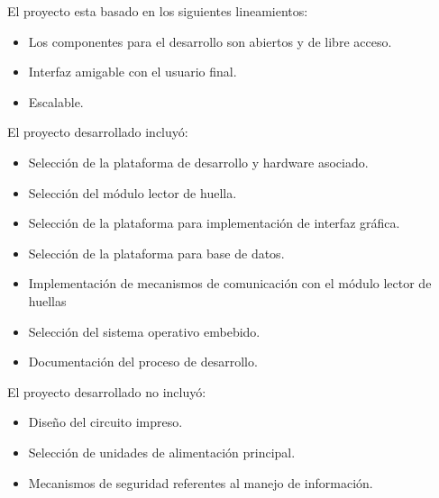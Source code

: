 El proyecto esta basado en los siguientes lineamientos:

\begin{itemize}
\item Los componentes para el desarrollo son abiertos y de libre acceso.	
\item Interfaz amigable con el usuario final.
\item Escalable.
\end{itemize}

El proyecto desarrollado incluyó:
\begin{itemize}
\item Selección de la plataforma de desarrollo y hardware asociado.
\item Selección del módulo lector de huella.	
\item Selección de la plataforma para implementación de interfaz gráfica.
\item Selección de la plataforma para base de datos.
\item Implementación de mecanismos de comunicación con el módulo lector de huellas
\item Selección del sistema operativo embebido.
\item Documentación del proceso de desarrollo.
\end{itemize}

El proyecto desarrollado no incluyó:

\begin{itemize}
\item Diseño del circuito impreso.	
\item Selección de unidades de alimentación principal.
\item Mecanismos de seguridad referentes al manejo de información.
\end{itemize}






